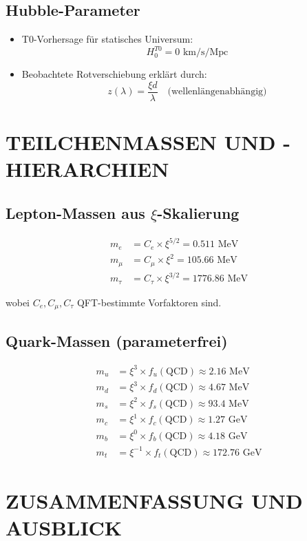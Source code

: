 \documentclass[12pt,a4paper]{article}
\begin{document}
	\subsection{Hubble-Parameter}
	\begin{itemize}
		\item T0-Vorhersage für statisches Universum:
		$$H_0^{T0} = 0 \text{ km/s/Mpc}$$
		
		\item Beobachtete Rotverschiebung erklärt durch:
		$$z(\lambda) = \frac{\xi d}{\lambda} \quad \text{(wellenlängenabhängig)}$$
	\end{itemize}
	
	\section{TEILCHENMASSEN UND -HIERARCHIEN}
	
	\subsection{Lepton-Massen aus $\xi$-Skalierung}
	\begin{align}
		m_e &= C_e \times \xi^{5/2} = 0.511 \text{ MeV}\\
		m_\mu &= C_\mu \times \xi^{2} = 105.66 \text{ MeV}\\
		m_\tau &= C_\tau \times \xi^{3/2} = 1776.86 \text{ MeV}
	\end{align}
	
	wobei $C_e, C_\mu, C_\tau$ QFT-bestimmte Vorfaktoren sind.
	
	\subsection{Quark-Massen (parameterfrei)}
	\begin{align}
		m_u &= \xi^{3} \times f_u(\text{QCD}) \approx 2.16 \text{ MeV}\\
		m_d &= \xi^{3} \times f_d(\text{QCD}) \approx 4.67 \text{ MeV}\\
		m_s &= \xi^{2} \times f_s(\text{QCD}) \approx 93.4 \text{ MeV}\\
		m_c &= \xi^{1} \times f_c(\text{QCD}) \approx 1.27 \text{ GeV}\\
		m_b &= \xi^{0} \times f_b(\text{QCD}) \approx 4.18 \text{ GeV}\\
		m_t &= \xi^{-1} \times f_t(\text{QCD}) \approx 172.76 \text{ GeV}
	\end{align}
	
	\section{ZUSAMMENFASSUNG UND AUSBLICK}
	
\end{document}
